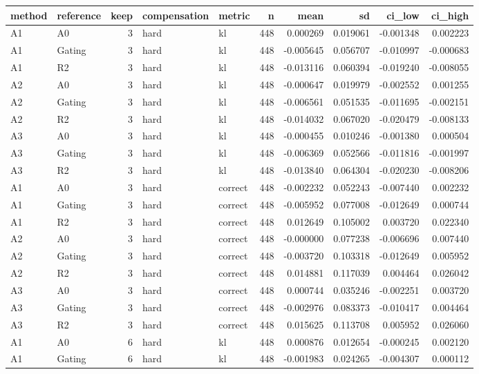 \begin{tabular}{llrllrrrrr}
\toprule
method & reference & keep & compensation & metric & n & mean & sd & ci_low & ci_high \\
\midrule
A1 & A0 & 3 & hard & kl & 448 & 0.000269 & 0.019061 & -0.001348 & 0.002223 \\
A1 & Gating & 3 & hard & kl & 448 & -0.005645 & 0.056707 & -0.010997 & -0.000683 \\
A1 & R2 & 3 & hard & kl & 448 & -0.013116 & 0.060394 & -0.019240 & -0.008055 \\
A2 & A0 & 3 & hard & kl & 448 & -0.000647 & 0.019979 & -0.002552 & 0.001255 \\
A2 & Gating & 3 & hard & kl & 448 & -0.006561 & 0.051535 & -0.011695 & -0.002151 \\
A2 & R2 & 3 & hard & kl & 448 & -0.014032 & 0.067020 & -0.020479 & -0.008133 \\
A3 & A0 & 3 & hard & kl & 448 & -0.000455 & 0.010246 & -0.001380 & 0.000504 \\
A3 & Gating & 3 & hard & kl & 448 & -0.006369 & 0.052566 & -0.011816 & -0.001997 \\
A3 & R2 & 3 & hard & kl & 448 & -0.013840 & 0.064304 & -0.020230 & -0.008206 \\
A1 & A0 & 3 & hard & correct & 448 & -0.002232 & 0.052243 & -0.007440 & 0.002232 \\
A1 & Gating & 3 & hard & correct & 448 & -0.005952 & 0.077008 & -0.012649 & 0.000744 \\
A1 & R2 & 3 & hard & correct & 448 & 0.012649 & 0.105002 & 0.003720 & 0.022340 \\
A2 & A0 & 3 & hard & correct & 448 & -0.000000 & 0.077238 & -0.006696 & 0.007440 \\
A2 & Gating & 3 & hard & correct & 448 & -0.003720 & 0.103318 & -0.012649 & 0.005952 \\
A2 & R2 & 3 & hard & correct & 448 & 0.014881 & 0.117039 & 0.004464 & 0.026042 \\
A3 & A0 & 3 & hard & correct & 448 & 0.000744 & 0.035246 & -0.002251 & 0.003720 \\
A3 & Gating & 3 & hard & correct & 448 & -0.002976 & 0.083373 & -0.010417 & 0.004464 \\
A3 & R2 & 3 & hard & correct & 448 & 0.015625 & 0.113708 & 0.005952 & 0.026060 \\
A1 & A0 & 6 & hard & kl & 448 & 0.000876 & 0.012654 & -0.000245 & 0.002120 \\
A1 & Gating & 6 & hard & kl & 448 & -0.001983 & 0.024265 & -0.004307 & 0.000112 \\

\end{tabular}
